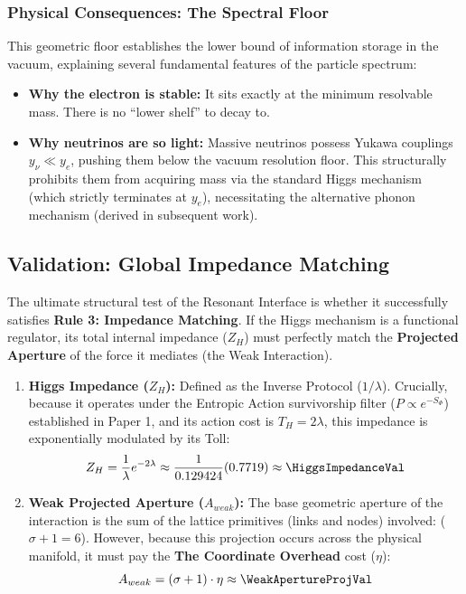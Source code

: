 \subsubsection{Physical Consequences: The Spectral Floor}
This geometric floor establishes the lower bound of information storage in the vacuum, explaining several fundamental features of the particle spectrum:
\begin{itemize}
    \item \textbf{Why the electron is stable:} It sits exactly at the minimum resolvable mass. There is no ``lower shelf'' to decay to.
    \item \textbf{Why neutrinos are so light:} Massive neutrinos possess Yukawa couplings $y_\nu \ll y_e$, pushing them below the vacuum resolution floor. This structurally prohibits them from acquiring mass via the standard Higgs mechanism (which strictly terminates at $y_e$), necessitating the alternative phonon mechanism (derived in subsequent work).
\end{itemize}

\subsection{Validation: Global Impedance Matching}
The ultimate structural test of the Resonant Interface is whether it successfully satisfies \textbf{Rule 3: Impedance Matching}. If the Higgs mechanism is a functional regulator, its total internal impedance ($Z_H$) must perfectly match the \textbf{Projected Aperture} of the force it mediates (the Weak Interaction).

\begin{enumerate}
    \item \textbf{Higgs Impedance ($Z_H$):} Defined as the Inverse Protocol ($1/\lambda$). Crucially, because it operates under the Entropic Action survivorship filter ($P \propto e^{-S_\Phi}$) established in Paper 1, and its action cost is $T_H = 2\lambda$, this impedance is exponentially modulated by its Toll:
    \begin{equation}
    Z_H = \frac{1}{\lambda} e^{-2\lambda} \approx \frac{1}{0.129424} (0.7719) \approx \mathbf{\HiggsImpedanceVal}
    \end{equation}
    
    \item \textbf{Weak Projected Aperture ($A_{weak}$):} The base geometric aperture of the interaction is the sum of the lattice primitives (links and nodes) involved: ($\sigma + 1 = 6$). However, because this projection occurs across the physical manifold, it must pay the \textbf{The Coordinate Overhead} cost ($\eta$):
    \begin{equation}
    A_{weak} = (\sigma + 1) \cdot \eta \approx \mathbf{\WeakApertureProjVal}
    \end{equation}
\end{enumerate}

